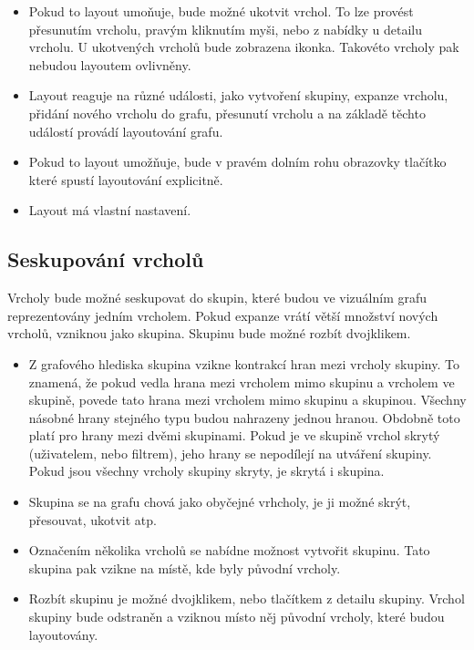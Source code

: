 \begin{itemize}
    \item Pokud to layout umoňuje, bude možné ukotvit vrchol. To lze provést přesunutím vrcholu, pravým kliknutím myši, nebo z nabídky u detailu vrcholu. U ukotvených vrcholů bude zobrazena ikonka. Takovéto vrcholy pak nebudou layoutem ovlivněny.
    \item Layout reaguje na různé události, jako vytvoření skupiny, expanze vrcholu, přidání nového vrcholu do grafu, přesunutí vrcholu a na základě těchto událostí provádí layoutování grafu.
    \item Pokud to layout umožňuje, bude v pravém dolním rohu obrazovky tlačítko které spustí layoutování explicitně.
    \item Layout má vlastní nastavení.
\end{itemize}

\subsection*{Seskupování vrcholů}
Vrcholy bude možné seskupovat do skupin, které budou ve vizuálním grafu reprezentovány jedním vrcholem. Pokud expanze vrátí větší množství nových vrcholů, vzniknou jako skupina. Skupinu bude možné rozbít dvojklikem.

\begin{itemize}
    \item Z grafového hlediska skupina vzikne kontrakcí hran mezi vrcholy skupiny. To znamená, že pokud vedla hrana mezi vrcholem mimo skupinu a vrcholem ve skupině, povede tato hrana mezi vrcholem mimo skupinu a skupinou. Všechny násobné hrany stejného typu budou nahrazeny jednou hranou. Obdobně toto platí pro hrany mezi dvěmi skupinami. Pokud je ve skupině vrchol skrytý (uživatelem, nebo filtrem), jeho hrany se nepodílejí na utváření skupiny. Pokud jsou všechny vrcholy skupiny skryty, je skrytá i skupina.
    \item Skupina se na grafu chová jako obyčejné vrhcholy, je ji možné skrýt, přesouvat, ukotvit atp.
    \item Označením několika vrcholů se nabídne možnost vytvořit skupinu. Tato skupina pak vzikne na místě, kde byly původní vrcholy.
    \item Rozbít skupinu je možné dvojklikem, nebo tlačítkem z detailu skupiny. Vrchol skupiny bude odstraněn a vziknou místo něj původní vrcholy, které budou layoutovány.
\end{itemize}
